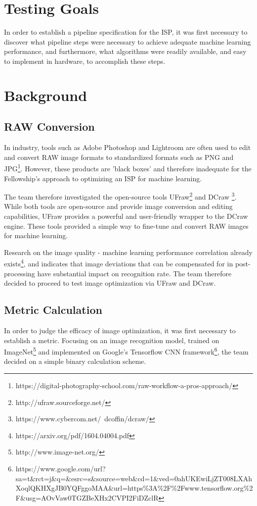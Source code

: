 \documentclass{report}
\begin{document}
	\section{Testing Goals}
	In order to establish a pipeline specification for the ISP, it was first necessary to discover what pipeline steps were necessary to achieve adequate machine learning performance, and furthermore, what algorithms were readily available, and easy to implement in hardware, to accomplish these steps.
	\section{Background}
		\subsection{RAW Conversion}
		In industry, tools such as Adobe Photoshop and Lightroom are often used to edit and convert RAW image formats to standardized formats such as PNG and JPG\footnote{https://digital-photography-school.com/raw-workflow-a-pros-approach/}. However, these products are 'black boxes' and therefore inadequate for the Fellowship's approach to optimizing an ISP for machine learning.
		
		The team therefore investigated the open-source tools UFraw\footnote{http://ufraw.sourceforge.net/} and DCraw \footnote{https://www.cybercom.net/~dcoffin/dcraw/}. While both tools are open-source and provide image conversion and editing capabilities, UFraw provides a powerful and user-friendly wrapper to the DCraw engine. These tools provided a simple way to fine-tune and convert RAW images for machine learning. 
		
		Research on the image quality - machine learning performance correlation already exists\footnote{https://arxiv.org/pdf/1604.04004.pdf}, and indicates that image deviations that can be compensated for in post-processing have substantial impact on recognition rate. The team therefore decided to proceed to test image optimization via UFraw and DCraw.
		\subsection{Metric Calculation}
		In order to judge the efficacy of image optimization, it was first necessary to establish a metric. Focusing on an image recognition model, trained on ImageNet\footnote{http://www.image-net.org/} and implemented on Google's Tensorflow CNN framework\footnote{https://www.google.com/url?sa=t\&rct=j\&q=\&esrc=s\&source=web\&cd=1\&ved=0ahUKEwiLjZT008LXAhXoqlQKHXgJB0YQFggoMAA\&url=https\%3A\%2F\%2Fwww.tensorflow.org\%2F\&usg=AOvVaw0TGZBeXHx2CVPI2FiDZclR}, the team decided on a simple binary calculation scheme.
		
\end{document}
